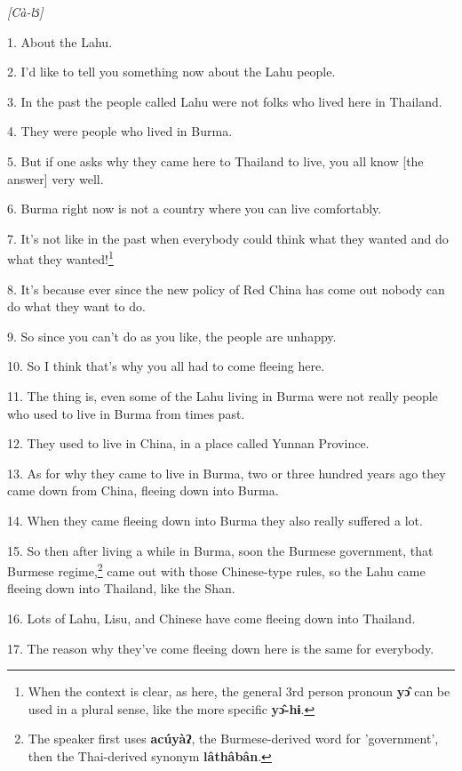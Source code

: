 \setcounter{footnote}{0}

\textit{[Cà-l}ɔ\textit{̂]}

1. About the Lahu.

2. I'd like to tell you something now about the Lahu people.

3. In the past the people called Lahu were not folks who lived here in Thailand.

4. They were people who lived in Burma.

5. But if one asks why they came here to Thailand to live, you all know [the answer]
very well.

6. Burma right now is not a country where you can live comfortably.

7. It's not like in the past when everybody could think what they wanted and do
what they wanted!\footnote{When the context is clear, as here, the general 3rd person pronoun \textbf{yɔ̂} can be used in a plural sense, like the more specific \textbf{yɔ̂-hɨ}.}

8. It's because ever since the new policy of Red China has come out nobody can
do what they want to do.

9. So since you can't do as you like, the people are unhappy.

10. So I think that's why you all had to come fleeing here.

11. The thing is, even some of the Lahu living in Burma were not really people who used to live in Burma from times past.

12. They used to live in China, in a place called Yunnan Province.

13. As for why they came to live in Burma, two or three hundred years ago they
came down from China, fleeing down into Burma.

14. When they came fleeing down into Burma they also really suffered a lot.

15. So then after living a while in Burma, soon the Burmese government, that Burmese
regime,\footnote{The speaker first uses \textbf{acúyàʔ}, the Burmese-derived word for 'government', then the Thai-derived synonym \textbf{lâthâbân}.} came out with those Chinese-type rules, so the Lahu came fleeing down
into Thailand, like the Shan.

16. Lots of Lahu, Lisu, and Chinese have come fleeing down into Thailand.

17. The reason why they've come fleeing down here is the same for everybody.

